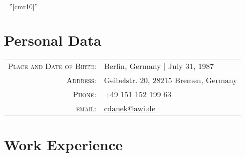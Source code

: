 \documentclass[a4paper,10pt]{article} %
\newcommand{\orcid}[1]{\href{https://orcid.org/#1}{\textcolor[HTML]{A6CE39}{\aiOrcid}}}
\begin{document}

\font\fb=''[cmr10]'' %

\par{\bigskip \qquad \LARGE \orcid{0000-0002-4453-1140} \LARGE \href{https://github.com/chrisdane}{\color{black}\faGithub} \href{https://stackoverflow.com/users/5098273/chris}{\color{black}\faStackOverflow} \par}
\vspace{0.1cm}

\section{Personal Data}
\vspace{0.3cm}

\begin{center}
\begin{tabular}{rl}
\textsc{Place and Date of Birth:} & Berlin, Germany  | July 31, 1987 \\
\textsc{Address:} & Geibelstr. 20, 28215 Bremen, Germany \\
\textsc{Phone:} & +49 151 152 199 63\\
\textsc{email:} & \href{mailto:cdanek@awi.de}{cdanek@awi.de}
\end{tabular}
\end{center}

\vspace{0.3cm}
\section{Work Experience}
\vspace{0.3cm}
\end{document}
